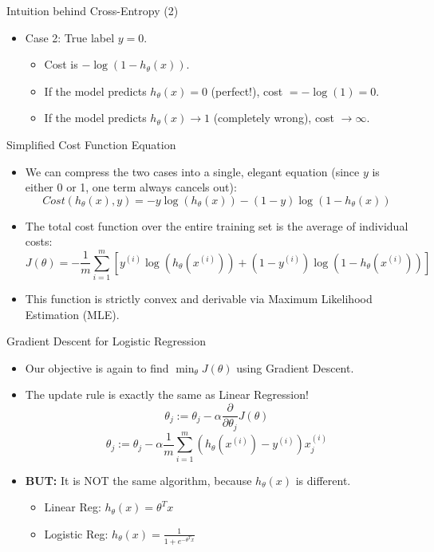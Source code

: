 \documentclass[aspectratio=169]{beamer}
\begin{document}
\begin{frame}{Intuition behind Cross-Entropy (2)}
\begin{itemize}
    \item Case 2: True label $y = 0$.
        \begin{itemize}
            \item Cost is $-\log(1 - h_\theta(x))$.
            \item If the model predicts $h_\theta(x) = 0$ (perfect!), cost $= -\log(1) = 0$.
            \item If the model predicts $h_\theta(x) \rightarrow 1$ (completely wrong), cost $\rightarrow \infty$.
        \end{itemize}
\end{itemize}
\end{frame}

\begin{frame}{Simplified Cost Function Equation}
\begin{itemize}
    \item We can compress the two cases into a single, elegant equation (since $y$ is either 0 or 1, one term always cancels out):
    $$ Cost(h_\theta(x), y) = -y \log(h_\theta(x)) - (1 - y) \log(1 - h_\theta(x)) $$
    \item The total cost function over the entire training set is the average of individual costs:
    $$ J(\theta) = -\frac{1}{m} \sum_{i=1}^{m} \left[ y^{(i)} \log(h_\theta(x^{(i)})) + (1 - y^{(i)}) \log(1 - h_\theta(x^{(i)})) \right] $$
    \item This function is strictly convex and derivable via Maximum Likelihood Estimation (MLE).
\end{itemize}
\end{frame}

\begin{frame}{Gradient Descent for Logistic Regression}
\begin{itemize}
    \item Our objective is again to find $\min_\theta J(\theta)$ using Gradient Descent.
    \item The update rule is exactly the same as Linear Regression!
    $$ \theta_j := \theta_j - \alpha \frac{\partial}{\partial \theta_j} J(\theta) $$
    $$ \theta_j := \theta_j - \alpha \frac{1}{m} \sum_{i=1}^{m} (h_\theta(x^{(i)}) - y^{(i)}) x_j^{(i)} $$
    \item \textbf{BUT:} It is NOT the same algorithm, because $h_\theta(x)$ is different.
        \begin{itemize}
            \item Linear Reg: $h_\theta(x) = \theta^T x$
            \item Logistic Reg: $h_\theta(x) = \frac{1}{1 + e^{-\theta^T x}}$
        \end{itemize}
\end{itemize}
\end{frame}
\end{document}
